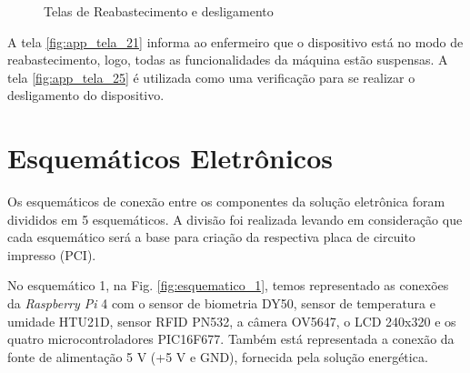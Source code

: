\begin{apendicesenv}
\begin{figure}[H]
    \centering
    \caption{Telas de Reabastecimento e desligamento }\label{fig:telas_21_25}
\end{figure}

A tela \ref{fig:app_tela_21} informa ao enfermeiro que o dispositivo está no modo de reabastecimento, logo, todas as funcionalidades da máquina estão suspensas. A tela \ref{fig:app_tela_25} é utilizada como uma verificação para se realizar o desligamento do dispositivo.

\chapter{Esquemáticos Eletrônicos}\label{esquematicos_eletronica}

Os esquemáticos de conexão entre os componentes da solução eletrônica foram divididos em 5 esquemáticos. A divisão foi realizada levando em consideração que cada esquemático será a base para criação da respectiva placa de circuito impresso (PCI).

No esquemático 1, na Fig. \ref{fig:esquematico_1}, temos representado as conexões da \textit{Raspberry Pi} 4 com o sensor de biometria DY50, sensor de temperatura e umidade HTU21D, sensor RFID PN532, a câmera OV5647, o LCD 240x320 e os quatro microcontroladores PIC16F677. Também está representada a conexão da fonte de alimentação 5 V (+5 V e GND), fornecida pela solução energética. 


\end{apendicesenv}
